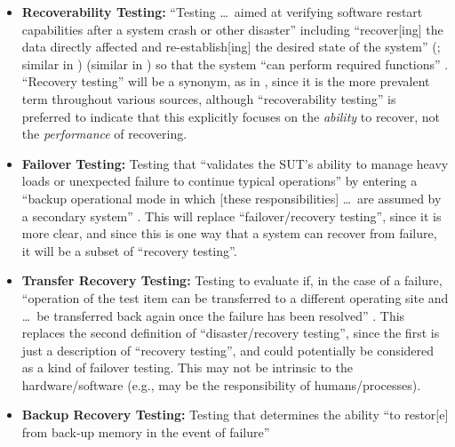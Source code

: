\begin{itemize}
      \item \textbf{Recoverability Testing:} ``Testing \dots\ aimed at
            verifying software restart capabilities after a system crash or
            other disaster'' \citep[p.~5-9]{SWEBOK2024} including ``recover[ing]
            the data directly affected and re-establish[ing] the desired state
            of the system''
            \ifnotpaper
                  (\citealp{ISO_IEC2023a}; similar in \citealp[p.~7-10]{SWEBOK2024})
            \else
                  \cite{ISO_IEC2023a} (similar in \cite[p.~7-10]{SWEBOK2024})
            \fi so that the system ``can perform
            required functions'' \citep[p.~370]{IEEE2017}. ``Recovery testing''
            will be a synonym, as in \citep[p.~47]{Kam2008}, since it is the
            more prevalent term throughout various sources, although
            ``recoverability testing'' is preferred to indicate that this
            explicitly focuses on the \emph{ability} to
            recover, not the \emph{performance} of recovering.
      \item \textbf{Failover Testing:} Testing that ``validates the SUT's
            ability to manage heavy loads or unexpected failure to continue
            typical operations'' \cite[p.~5-9]{SWEBOK2024} by entering a
            ``backup operational mode in which [these responsibilities] \dots\
            are assumed by a secondary system'' \citepISTQB{}. This will
            replace ``failover/recovery testing'', since it is more clear, and
            since this is one way that a system can recover from failure, it
            will be a subset of ``recovery testing''.
      \item \textbf{Transfer Recovery Testing:} Testing to evaluate if,
            in the case of a failure, ``operation of the test item can be
            transferred to a different operating site and \dots\ be transferred
            back again once the failure has been resolved''
            \citeyearpar[p.~37]{IEEE2021}. This replaces the second definition
            of ``disaster/recovery testing'', since the first is just a
            description of ``recovery testing'', and could potentially be
            considered as a kind of failover testing. This may not be
            intrinsic to the hardware/software (e.g., may be the responsibility
            of humans/processes).
      \item \textbf{Backup Recovery Testing:} Testing that determines the
            ability ``to restor[e] from back-up memory in the event of failure''

\end{itemize}
